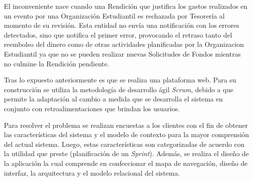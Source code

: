 \begin{resumen}


    

    El inconveniente nace cuando una Rendición que justifica los gastos realizados en un evento por una Organización Estudiantil es rechazada por Tesorería al momento de su revisión. Esta entidad no envía una notificación con los errores detectados, sino que notifica el primer error, provocando el retraso tanto del reembolso del dinero como de otras actividades planificadas por la Organizacion Estudiantil ya que no se pueden realizar nuevas Solicitudes de Fondos mientras no culmine la Rendición pendiente.
    
    Tras lo expuesto anteriormente es que se realiza una plataforma web. Para su construcción se utiliza la metodología de desarrollo ágil \emph{Scrum}, debido a que permite la adaptación al cambio a medida que se desarrolla el sistema en conjunto con retroalimentaciones que brindan los usuarios.
    

    

    Para resolver el problema se realizan encuestas a los clientes con el fin de obtener las características del sistema y el modelo de contexto para la mayor comprensión del actual sistema. Luego, estas características son categorizadas de acuerdo con la utilidad que preste (planificación de un \emph{Sprint}). Además, se realiza el diseño de la aplicación la cual comprende en confeccionar el mapa de navegación, diseño de interfaz, la arquitectura y el modelo relacional del sistema. 
    

\end{resumen}
